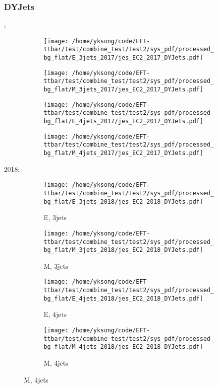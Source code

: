\documentclass{beamer}
\begin{document}
\begin{frame}
\frametitle{DYJets}
\fontsize{5}{1}:
\begin{figure}
\centering
\begin{subfigure}[b]{0.24\textwidth}
\texttt{[image: /home/yksong/code/EFT-ttbar/test/combine\_test/test2/sys\_pdf/processed\_bg\_flat/E\_3jets\_2017/jes\_EC2\_2017\_DYJets.pdf]}
\end{subfigure}
\begin{subfigure}[b]{0.24\textwidth}
\texttt{[image: /home/yksong/code/EFT-ttbar/test/combine\_test/test2/sys\_pdf/processed\_bg\_flat/M\_3jets\_2017/jes\_EC2\_2017\_DYJets.pdf]}
\end{subfigure}
\begin{subfigure}[b]{0.24\textwidth}
\texttt{[image: /home/yksong/code/EFT-ttbar/test/combine\_test/test2/sys\_pdf/processed\_bg\_flat/E\_4jets\_2017/jes\_EC2\_2017\_DYJets.pdf]}
\end{subfigure}
\begin{subfigure}[b]{0.24\textwidth}
\texttt{[image: /home/yksong/code/EFT-ttbar/test/combine\_test/test2/sys\_pdf/processed\_bg\_flat/M\_4jets\_2017/jes\_EC2\_2017\_DYJets.pdf]}
\end{subfigure}
\end{figure}
2018:
\begin{figure}
\centering
\begin{subfigure}[b]{0.24\textwidth}
\texttt{[image: /home/yksong/code/EFT-ttbar/test/combine\_test/test2/sys\_pdf/processed\_bg\_flat/E\_3jets\_2018/jes\_EC2\_2018\_DYJets.pdf]}
\captionsetup{font=tiny}
\caption{E, 3jets}
\end{subfigure}
\begin{subfigure}[b]{0.24\textwidth}
\texttt{[image: /home/yksong/code/EFT-ttbar/test/combine\_test/test2/sys\_pdf/processed\_bg\_flat/M\_3jets\_2018/jes\_EC2\_2018\_DYJets.pdf]}
\captionsetup{font=tiny}
\caption{M, 3jets}
\end{subfigure}
\begin{subfigure}[b]{0.24\textwidth}
\texttt{[image: /home/yksong/code/EFT-ttbar/test/combine\_test/test2/sys\_pdf/processed\_bg\_flat/E\_4jets\_2018/jes\_EC2\_2018\_DYJets.pdf]}
\captionsetup{font=tiny}
\caption{E, 4jets}
\end{subfigure}
\begin{subfigure}[b]{0.24\textwidth}
\texttt{[image: /home/yksong/code/EFT-ttbar/test/combine\_test/test2/sys\_pdf/processed\_bg\_flat/M\_4jets\_2018/jes\_EC2\_2018\_DYJets.pdf]}
\captionsetup{font=tiny}
\caption{M, 4jets}
\end{subfigure}
\end{figure}
\end{frame}
\end{document}
